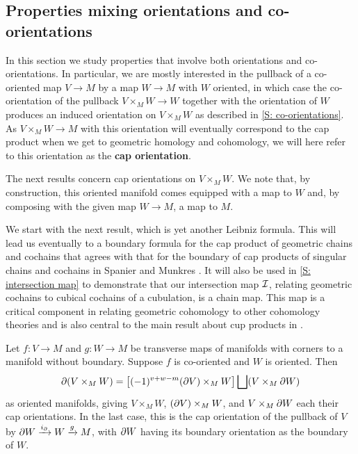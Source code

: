 \subsection{Properties mixing orientations and co-orientations}\label{S: mixing}

In this section we study properties that involve both orientations and co-orientations.
In particular, we are mostly interested in the pullback of a co-oriented map $V \to M$ by a map $W \to M$ with $W$ oriented, in which case the co-orientation of the pullback $V \times_M W \to W$ together with the orientation of $W$ produces an induced orientation on $V \times_M W$ as described in \cref{S: co-orientations}.
As $V \times_M W \to M$ with this orientation will eventually correspond to the cap product when we get to geometric homology and cohomology, we will here refer to this orientation as the \textbf{cap orientation}.

The next results concern cap orientations on $V \times_M W$.
We note that, by construction, this oriented manifold comes equipped with a map to $W$ and, by composing with the given map $W \to M$, a map to $M$.

We start with the next result, which is yet another Leibniz formula.
This will lead us eventually to a boundary formula for the cap product of geometric chains and cochains that agrees with that for the boundary of cap products of singular chains and cochains in Spanier \cite[Section 5.6.15]{Span81} and Munkres \cite[Section 66]{Mun84}.
It will also be used in \cref{S: intersection map} to demonstrate that our intersection map $\mathcal{I}$, relating geometric cochains to cubical cochains of a cubulation, is a chain map.
This map is a critical component in relating geometric cohomology to other cohomology theories and is also central to the main result about cup products in \cite{FMS-flows}.

\begin{proposition}\label{P: Leibniz cap}
	Let $f \colon V \to M$ and $g \colon W \to M$ be transverse maps of manifolds with corners to a manifold without boundary.
	Suppose $f$ is co-oriented and $W$ is oriented.
	Then $$\partial(V \times_M W) = \left[(-1)^{v+w-m} (\partial V) \times_M W\right] \bigsqcup (V \times_M \partial W)$$
	as oriented manifolds, giving $V \times_M W$, $(\partial V) \times_M W$, and $V \times_M \partial W$ each their cap orientations.
	In the last case, this is the cap orientation of the pullback of $V$ by $\partial W \xrightarrow{i_{\partial}} W \xrightarrow{g} M$, with $\partial W$ having its boundary orientation as the boundary of $W$.
\end{proposition}

